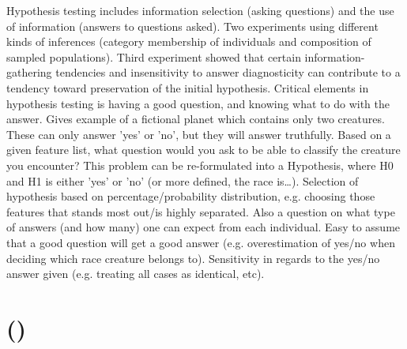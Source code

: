 Hypothesis testing includes information selection (asking questions) and the use of information (answers to questions asked). 
Two experiments using different kinds of inferences (category membership of individuals and composition of sampled populations). 
Third experiment showed that certain information-gathering tendencies and insensitivity to answer diagnosticity can contribute to a tendency toward preservation of the initial hypothesis. 
Critical elements in hypothesis testing is having a good question, and knowing what to do with the answer. 
Gives example of a fictional planet which contains only two creatures. 
These can only answer 'yes' or 'no', but they will answer truthfully. 
Based on a given feature list, what question would you ask to be able to classify the creature you encounter? 
This problem can be re-formulated into a Hypothesis, where H0 and H1 is either 'yes' or 'no' (or more defined, the race is\ldots). 
Selection of hypothesis based on percentage/probability distribution, e.g. choosing those features that stands most out/is highly separated. 
Also a question on what type of answers (and how many) one can expect from each individual. 
Easy to assume that a good question will get a good answer (e.g. overestimation of yes/no when deciding which race creature belongs to). 
Sensitivity in regards to the yes/no answer given (e.g. treating all cases as identical, etc).
\cite{Slowiaczek1992}

\section[Question-Answering]{ ()}
\label{sec:question_answering}


